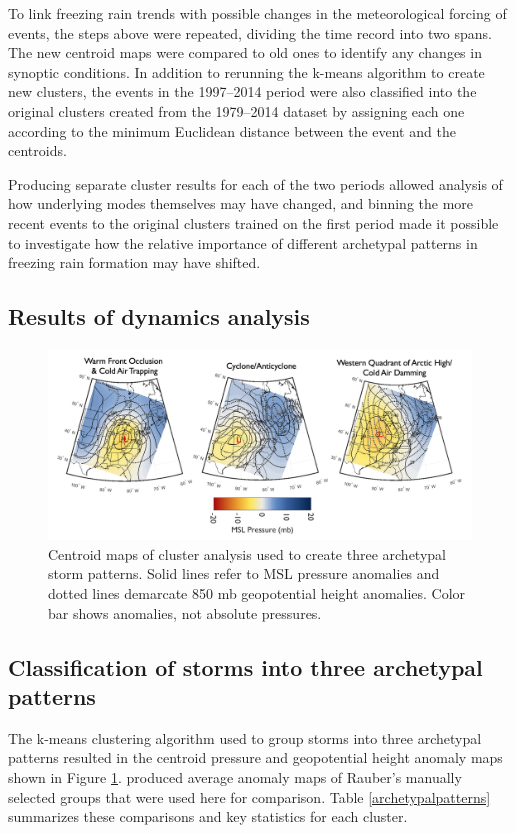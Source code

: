 \documentclass[twocol]{ametsoc}
\begin{document}
To link freezing rain trends with possible changes in the meteorological forcing of events, the steps above were repeated, dividing the time record into two spans. The new centroid maps were compared to old ones to identify any changes in synoptic conditions. In addition to rerunning the k-means algorithm to create new clusters, the events in the 1997--2014 period were also classified into the original clusters created from the 1979--2014 dataset by assigning each one according to the minimum Euclidean distance between the event and the centroids. 

Producing separate cluster results for each of the two periods allowed analysis of how underlying modes themselves may have changed, and binning the more recent events to the original clusters trained on the first period made it possible to investigate how the relative importance of different archetypal patterns in freezing rain formation may have shifted.

\subsection{Results of dynamics analysis}

\begin{figure}
\centering
\includegraphics[width=1\textwidth]{Cluster_Centroids.png}
\caption{\label{fig:centroids} Centroid maps of cluster analysis  used to create three archetypal storm patterns. Solid lines refer to MSL pressure anomalies and dotted lines demarcate 850 mb geopotential height anomalies. Color bar shows anomalies, not absolute pressures.}
\end{figure}

\subsection{Classification of storms into three archetypal patterns}
The k-means clustering algorithm used to group storms into three archetypal patterns resulted in the centroid pressure and geopotential height anomaly maps shown in Figure \ref{fig:centroids}. \citet{erfani2012automated} produced average anomaly maps of Rauber's manually selected groups that were used here for comparison. Table \ref{archetypalpatterns} summarizes these comparisons and key statistics for each cluster.
\end{document}
